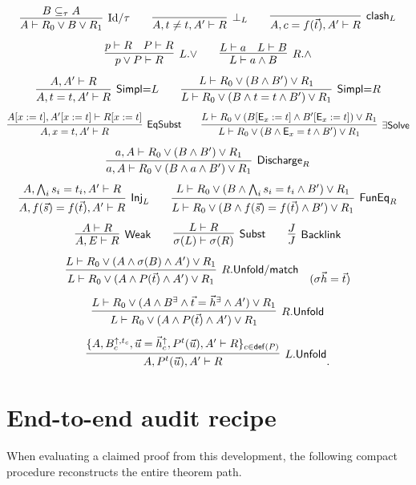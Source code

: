 \documentclass[11pt,oneside]{book}
\newcommand{\EV}{\mathsf{E}}
\begin{document}
\[
\infer[\mathrm{Id}/\tau]{A\vdash R_0\lor B\lor R_1}{B\subseteq_\tau A}
\qquad
\infer[\bot_L]{A,t\ne t,A'\vdash R}{}
\qquad
\infer[\mathsf{clash}_L]{A,c=f(\vec t),A'\vdash R}{}
\]
\[
\infer[L.\lor]{p\lor P\vdash R}{p\vdash R & P\vdash R}
\qquad
\infer[R.\land]{L\vdash a\land B}{L\vdash a & L\vdash B}
\]
\[
\infer[\mathsf{Simpl}{=}L]{A,t=t,A'\vdash R}{A,A'\vdash R}
\qquad
\infer[\mathsf{Simpl}{=}R]{L\vdash R_0\lor(B\land t=t\land B')\lor R_1}
  {L\vdash R_0\lor(B\land B')\lor R_1}
\]
\[
\infer[\mathsf{EqSubst}]{A,x=t,A'\vdash R}
  {A[x:=t],A'[x:=t]\vdash R[x:=t]}
\qquad
\infer[\exists\mathsf{Solve}]{L\vdash R_0\lor(B\land \EV_x=t\land B')\lor R_1}
  {L\vdash R_0\lor(B[\EV_x:=t]\land B'[\EV_x:=t])\lor R_1}
\]
\[
\infer[\mathsf{Discharge}_R]{a,A\vdash R_0\lor(B\land a\land B')\lor R_1}
  {a,A\vdash R_0\lor(B\land B')\lor R_1}
\]
\[
\infer[\mathsf{Inj}_L]{A,f(\vec s)=f(\vec t),A'\vdash R}
  {A,\bigwedge_i s_i=t_i,A'\vdash R}
\qquad
\infer[\mathsf{FunEq}_R]{L\vdash R_0\lor(B\land f(\vec s)=f(\vec t)\land B')\lor R_1}
  {L\vdash R_0\lor(B\land\bigwedge_i s_i=t_i\land B')\lor R_1}
\]
\[
\infer[\mathsf{Weak}]{A,E\vdash R}{A\vdash R}
\qquad
\infer[\mathsf{Subst}]{\sigma(L)\vdash\sigma(R)}{L\vdash R}
\qquad
\infer[\mathsf{Backlink}]{J}{J}
\]
\[
\infer[R.\mathsf{Unfold}/\mathsf{match}]
 {L\vdash R_0\lor(A\land P(\vec t)\land A')\lor R_1}
 {L\vdash R_0\lor(A\land\sigma(B)\land A')\lor R_1}
\quad(\sigma\vec h=\vec t)
\]
\[
\infer[R.\mathsf{Unfold}]
 {L\vdash R_0\lor(A\land P(\vec t)\land A')\lor R_1}
 {L\vdash R_0\lor(A\land B^\exists\land\vec t=\vec h^\exists\land A')\lor R_1}
\]
\[
\infer[L.\mathsf{Unfold}]
 {A,P^t(\vec u),A'\vdash R}
 {\{A,B_c^{\uparrow,t_c},\vec u=\vec h_c^\uparrow,
      P^t(\vec u),A'\vdash R\}_{c\in\mathsf{def}(P)}}.
\]

\chapter{End-to-end audit recipe}
\label{app:audit}

When evaluating a claimed proof from this development, the following compact
procedure reconstructs the entire theorem path.
\end{document}
